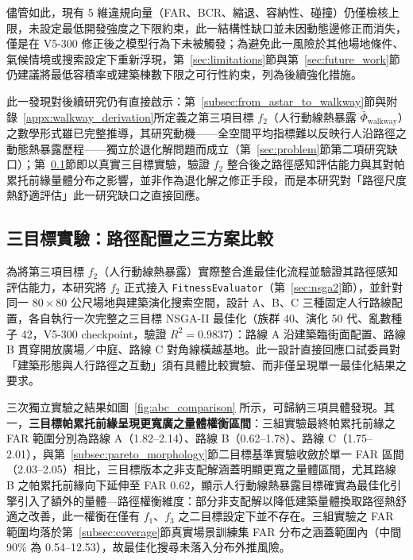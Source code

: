 儘管如此，現有 5 維違規向量（FAR、BCR、縮退、容納性、碰撞）仍僅檢核上限，未設定最低開發強度之下限約束，此一結構性缺口並未因動態邊修正而消失，僅是在 V5-300 修正後之模型行為下未被觸發；為避免此一風險於其他場地條件、氣候情境或搜索設定下重新浮現，第~\ref{sec:limitations}節與第~\ref{sec:future_work}節仍建議將最低容積率或建築棟數下限之可行性約束，列為後續強化措施。

此一發現對後續研究仍有直接啟示：第~\ref{subsec:from_astar_to_walkway}節與附錄~\ref{appx:walkway_derivation}所定義之第三項目標 $f_2$（人行動線熱暴露 $\bar{\Phi}_{\text{walkway}}$）之數學形式雖已完整推導，其研究動機——全空間平均指標難以反映行人沿路徑之動態熱暴露歷程——獨立於退化解問題而成立（第~\ref{sec:problem}節第二項研究缺口）；第~\ref{subsec:abc_comparison}節即以真實三目標實驗，驗證 $f_2$ 整合後之路徑感知評估能力與其對帕累托前緣量體分布之影響，並非作為退化解之修正手段，而是本研究對「路徑尺度熱舒適評估」此一研究缺口之直接回應。


\subsection{三目標實驗：路徑配置之三方案比較}
\label{subsec:abc_comparison}

為將第三項目標 $f_2$（人行動線熱暴露）實際整合進最佳化流程並驗證其路徑感知評估能力，本研究將 $f_2$ 正式接入 \texttt{FitnessEvaluator}（第~\ref{sec:nsga2}節），並針對同一 $80\times80$ 公尺場地與建築演化搜索空間，設計 A、B、C 三種固定人行路線配置，各自執行一次完整之三目標 NSGA-II 最佳化（族群 40、演化 50 代、亂數種子 42，V5-300 checkpoint，驗證 $R^2=0.9837$）：路線 A 沿建築臨街面配置、路線 B 貫穿開放廣場／中庭、路線 C 對角線橫越基地。此一設計直接回應口試委員對「建築形態與人行路徑之互動」須有具體比較實驗、而非僅呈現單一最佳化結果之要求。

三次獨立實驗之結果如圖~\ref{fig:abc_comparison} 所示，可歸納三項具體發現。其一，\textbf{三目標帕累托前緣呈現更寬廣之量體權衡區間}：三組實驗最終帕累托前緣之 FAR 範圍分別為路線 A（1.82--2.14）、路線 B（0.62--1.78）、路線 C（1.75--2.01），與第~\ref{subsec:pareto_morphology}節二目標基準實驗收斂於單一 FAR 區間（2.03--2.05）相比，三目標版本之非支配解涵蓋明顯更寬之量體區間，尤其路線 B 之帕累托前緣向下延伸至 FAR 0.62，顯示人行動線熱暴露目標確實為最佳化引擎引入了額外的量體—路徑權衡維度：部分非支配解以降低建築量體換取路徑熱舒適之改善，此一權衡在僅有 $f_1$、$f_3$ 之二目標設定下並不存在。三組實驗之 FAR 範圍均落於第~\ref{subsec:coverage}節真實場景訓練集 FAR 分布之涵蓋範圍內（中間 90\% 為 0.54--12.53），故最佳化搜尋未落入分布外推風險。

